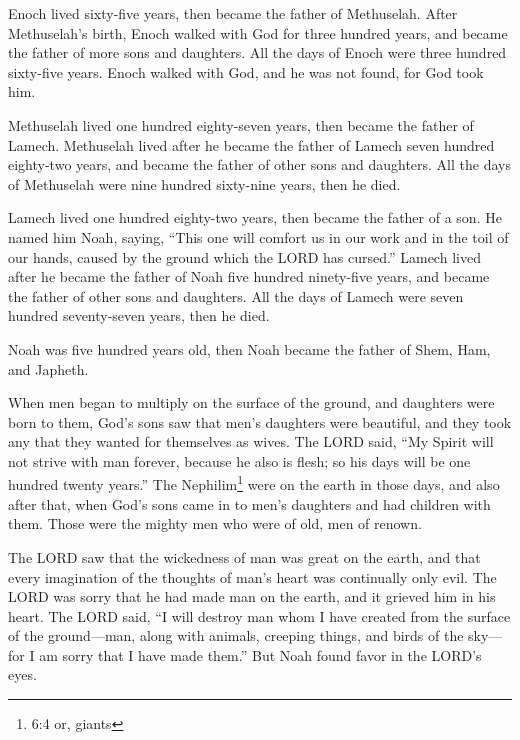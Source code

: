 \myverse{}Enoch lived sixty-five years, then became the father of Methuselah. \myverse{}After Methuselah’s birth, Enoch walked with God for three hundred years, and became the father of more sons and daughters. \myverse{}All the days of Enoch were three hundred sixty-five years. \myverse{}Enoch walked with God, and he was not found, for God took him.

\myverse{}Methuselah lived one hundred eighty-seven years, then became the father of Lamech. \myverse{}Methuselah lived after he became the father of Lamech seven hundred eighty-two years, and became the father of other sons and daughters. \myverse{}All the days of Methuselah were nine hundred sixty-nine years, then he died.

\myverse{}Lamech lived one hundred eighty-two years, then became the father of a son. \myverse{}He named him Noah, saying, “This one will comfort us in our work and in the toil of our hands, caused by the ground which the LORD has cursed.” \myverse{}Lamech lived after he became the father of Noah five hundred ninety-five years, and became the father of other sons and daughters. \myverse{}All the days of Lamech were seven hundred seventy-seven years, then he died.

\myverse{}Noah was five hundred years old, then Noah became the father of Shem, Ham, and Japheth.


\mychapter{}
\myverse*{}When men began to multiply on the surface of the ground, and daughters were born to them, \myverse{}God’s sons saw that men’s daughters were beautiful, and they took any that they wanted for themselves as wives.  \myverse{}The LORD said, “My Spirit will not strive with man forever, because he also is flesh; so his days will be one hundred twenty years.”  \myverse{}The Nephilim\footnote{6:4 or, giants} were on the earth in those days, and also after that, when God’s sons came in to men’s daughters and had children with them. Those were the mighty men who were of old, men of renown.

\myverse{}The LORD saw that the wickedness of man was great on the earth, and that every imagination of the thoughts of man’s heart was continually only evil.  \myverse{}The LORD was sorry that he had made man on the earth, and it grieved him in his heart.  \myverse{}The LORD said, “I will destroy man whom I have created from the surface of the ground—man, along with animals, creeping things, and birds of the sky—for I am sorry that I have made them.”  \myverse{}But Noah found favor in the LORD’s eyes.

